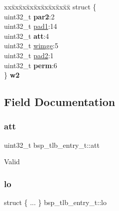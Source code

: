 \begin{DoxyCompactItemize}
\begin{tabbing}
\end{tabbing}\item 
\mbox{\label{structbsp__tlb__entry__t_ab860223a90e1a627e5c740deff71d3df}} 
\begin{tabbing}
xx\=xx\=xx\=xx\=xx\=xx\=xx\=xx\=xx\=\kill
struct \{\\
\>uint32\_t {\bfseries par2}:2\\
\>uint32\_t \mbox{\hyperlink{structbsp__tlb__entry__t_a0a704f899a80ae6919d0ea9ddca357b1}{pad1}}:14\\
\>uint32\_t {\bfseries att}:4\\
\>uint32\_t \mbox{\hyperlink{structbsp__tlb__entry__t_aa5f05607c9c1e2e1c761f719e30db36c}{wimge}}:5\\
\>uint32\_t \mbox{\hyperlink{structbsp__tlb__entry__t_a71270c885399c4fa5969c68b4ff5b3e1}{pad2}}:1\\
\>uint32\_t {\bfseries perm}:6\\
\} {\bfseries w2}\\

\end{tabbing}\end{DoxyCompactItemize}


\subsection{Field Documentation}
\mbox{\label{structbsp__tlb__entry__t_a9b3a9e52b01ba5da0ac7c5da5593add0}} 
\subsubsection{\texorpdfstring{att}{att}}
{\footnotesize\ttfamily uint32\+\_\+t bsp\+\_\+tlb\+\_\+entry\+\_\+t\+::att}

Valid \mbox{\label{structbsp__tlb__entry__t_a657df6e353bf882caf581f9977fc046d}} 
\subsubsection{\texorpdfstring{lo}{lo}}
{\footnotesize\ttfamily struct \{ ... \}          bsp\+\_\+tlb\+\_\+entry\+\_\+t\+::lo}

